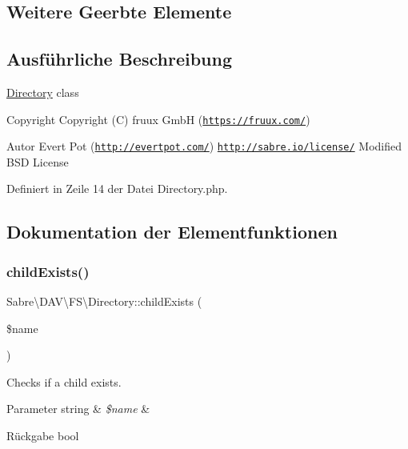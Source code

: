 \subsection*{Weitere Geerbte Elemente}


\subsection{Ausführliche Beschreibung}
\mbox{\hyperlink{class_sabre_1_1_d_a_v_1_1_f_s_1_1_directory}{Directory}} class

\begin{DoxyCopyright}{Copyright}
Copyright (C) fruux GmbH (\href{https://fruux.com/}{\tt https\+://fruux.\+com/}) 
\end{DoxyCopyright}
\begin{DoxyAuthor}{Autor}
Evert Pot (\href{http://evertpot.com/}{\tt http\+://evertpot.\+com/})  \href{http://sabre.io/license/}{\tt http\+://sabre.\+io/license/} Modified B\+SD License 
\end{DoxyAuthor}


Definiert in Zeile 14 der Datei Directory.\+php.



\subsection{Dokumentation der Elementfunktionen}
\mbox{\label{class_sabre_1_1_d_a_v_1_1_f_s_1_1_directory_a30d9098d57f5e0ffb0cdb782f2a22ec0}} 
\subsubsection{\texorpdfstring{child\+Exists()}{childExists()}}
{\footnotesize\ttfamily Sabre\textbackslash{}\+D\+A\+V\textbackslash{}\+F\+S\textbackslash{}\+Directory\+::child\+Exists (\begin{DoxyParamCaption}\item[{}]{\$name }\end{DoxyParamCaption})}

Checks if a child exists.


\begin{DoxyParams}[1]{Parameter}
string & {\em \$name} & \\
\hline
\end{DoxyParams}
\begin{DoxyReturn}{Rückgabe}
bool 
\end{DoxyReturn}



